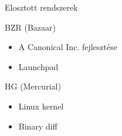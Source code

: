 
\begin{frame}{Elosztott rendszerek}
    \pause
    \begin{block}{BZR (Bazaar)}
        \begin{itemize}
            \pause \item A Canonical Inc. fejlesztése
            \pause \item Launchpad
        \end{itemize}
    \end{block}
    \pause
    \begin{block}{HG (Mercurial)}
        \begin{itemize}
            \pause \item Linux kernel
            \pause \item Binary diff
        \end{itemize}
    \end{block}
\end{frame}

